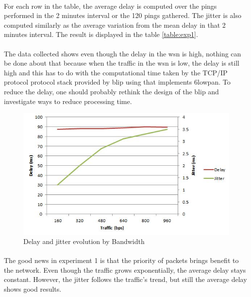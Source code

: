 \documentclass[oneside,12pt,a4paper,final]{book}
\begin{document}
\paragraph{}
For each row in the table, the average delay is computed over the pings performed in the 2 minutes interval or the 120 pings gathered. The jitter is also computed similarly as the average variation from the mean delay in that 2 minutes interval. The result is displayed in the table \ref{table:exp1}. 
\paragraph{}
The data collected shows even though the delay in the \gls{wsn} is high, 
 nothing can be done about that because when the traffic in the \gls{wsn} is low, the delay is still high and this has to do with the computational time taken by the TCP/IP protocol protocol stack provided by \gls{blip} using that implements \gls{6lowpan}. To reduce the delay, one should probably rethink the design of the \gls{blip} and investigate ways to reduce processing time.
 
 \begin{figure}[htbp]
 \centering
 \includegraphics[scale=1]{img/delay_jitter.JPG}
 \caption{Delay and jitter evolution by Bandwidth}
 \label{fig:delay_jitter}
 \end{figure}
 
 \paragraph{}
 The good news in experiment 1 is that the priority of packets brings benefit to the network. Even though the traffic grows exponentially, the average delay stays constant. However, the jitter follows the traffic's trend, but still the average delay shows good results. 
\end{document}
